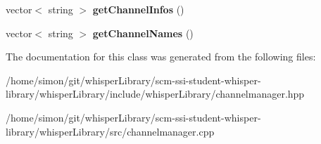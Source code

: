 \begin{DoxyCompactItemize}
\item 
\hypertarget{classwhisper__library_1_1ChannelManager_a01b025f7cb19645c514dd6da628b92ec}{vector$<$ string $>$ {\bfseries get\-Channel\-Infos} ()}\label{classwhisper__library_1_1ChannelManager_a01b025f7cb19645c514dd6da628b92ec}

\item 
\hypertarget{classwhisper__library_1_1ChannelManager_a209952f9b28abac7a41a97a075a25911}{vector$<$ string $>$ {\bfseries get\-Channel\-Names} ()}\label{classwhisper__library_1_1ChannelManager_a209952f9b28abac7a41a97a075a25911}

\end{DoxyCompactItemize}


\-The documentation for this class was generated from the following files\-:\begin{DoxyCompactItemize}
\item 
/home/simon/git/whisper\-Library/scm-\/ssi-\/student-\/whisper-\/library/whisper\-Library/include/whisper\-Library/channelmanager.\-hpp\item 
/home/simon/git/whisper\-Library/scm-\/ssi-\/student-\/whisper-\/library/whisper\-Library/src/channelmanager.\-cpp\end{DoxyCompactItemize}
